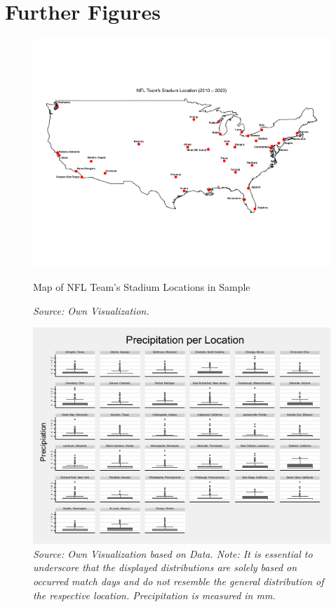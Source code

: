 \documentclass[12pt,a4paper]{article}
\begin{document}
{\section{Further Figures}
\begin{figure}[h]
	\center
	\includegraphics[scale=0.59, angle = 90]{../05_Figures/Teams_Location.pdf}
	\caption{Map of NFL Team's Stadium Locations in Sample}
	\caption*{\footnotesize \textit{Source: Own Visualization.}}
	\label{AppF:1}
\end{figure}
\clearpage
\vfill
\begin{figure}
	\center
	\includegraphics[scale=1.7]{../05_Figures/Percipitation_per_Place.pdf}
	\caption*{\footnotesize \textit{Source: Own Visualization based on \citeauthor{PRISM} Data. Note: It is essential to underscore that the displayed distributions are solely based on occurred match days and do not resemble the general distribution of the respective location. Precipitation is measured in mm.}}

\end{figure}}
\end{document}
